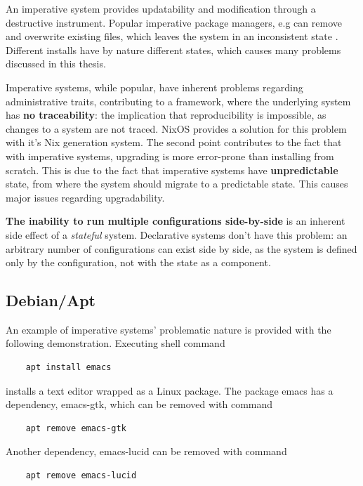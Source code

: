 An imperative system provides updatability and modification through a destructive instrument. Popular imperative package managers, e.g can remove and overwrite existing files, which leaves the system in an inconsistent state \cite{dolstra2008nixos}. Different installs have by nature different states, which causes many problems discussed in this thesis.

Imperative systems, while popular, have inherent problems regarding administrative traits, contributing to a framework, where the underlying system has \textbf{no traceability}: the implication that reproducibility is impossible, as changes to a system are not traced. NixOS provides a solution for this problem with it's Nix generation system. The second point contributes to the fact that with imperative systems, upgrading is more error-prone than installing from scratch. This is due to the fact that imperative systems have \textbf{unpredictable} state, from where the system should migrate to a predictable state. This causes major issues regarding upgradability. \cite{dolstra2007purely}

\textbf{The inability to run multiple configurations side-by-side} is an inherent side effect of a \textit{stateful} system. Declarative systems don't have this problem: an arbitrary number of configurations can exist side by side, as the system is defined only by the configuration, not with the state as a component. \cite{dolstra2007purely}



\subsection{Debian/Apt}

An example of imperative systems' problematic nature is provided with the following demonstration. Executing shell command
\begin{lstlisting}
    apt install emacs
\end{lstlisting}
installs a text editor wrapped as a Linux package.
The package emacs has a dependency, emacs-gtk, which can be removed with command
\begin{lstlisting}
    apt remove emacs-gtk
\end{lstlisting}
Another dependency, emacs-lucid can be removed with command
\begin{lstlisting}
    apt remove emacs-lucid
\end{lstlisting}

